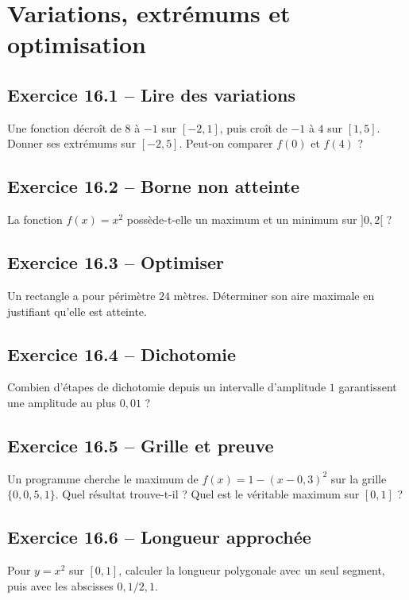 \chapter{Variations, extrémums et optimisation}
\section*{Exercice 16.1 -- Lire des variations}
Une fonction décroît de $8$ à $-1$ sur $[-2,1]$, puis croît de $-1$ à $4$ sur $[1,5]$. Donner ses extrémums sur $[-2,5]$. Peut-on comparer $f(0)$ et $f(4)$ ?

\section*{Exercice 16.2 -- Borne non atteinte}
La fonction $f(x)=x^2$ possède-t-elle un maximum et un minimum sur $]0,2[$ ?

\section*{Exercice 16.3 -- Optimiser}
Un rectangle a pour périmètre $24$ mètres. Déterminer son aire maximale en justifiant qu'elle est atteinte.

\section*{Exercice 16.4 -- Dichotomie}
Combien d'étapes de dichotomie depuis un intervalle d'amplitude $1$ garantissent une amplitude au plus $0{,}01$ ?

\section*{Exercice 16.5 -- Grille et preuve}
Un programme cherche le maximum de $f(x)=1-(x-0{,}3)^2$ sur la grille $\{0,0{,}5,1\}$. Quel résultat trouve-t-il ? Quel est le véritable maximum sur $[0,1]$ ?

\section*{Exercice 16.6 -- Longueur approchée}
Pour $y=x^2$ sur $[0,1]$, calculer la longueur polygonale avec un seul segment, puis avec les abscisses $0,1/2,1$.
